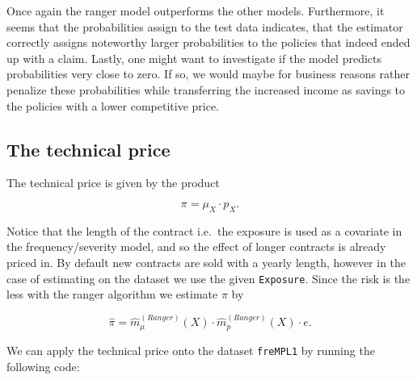 \documentclass[
]{article}
\begin{document}
Once again the ranger model outperforms the other models. Furthermore,
it seems that the probabilities assign to the test data indicates, that
the estimator correctly assigns noteworthy larger probabilities to the
policies that indeed ended up with a claim. Lastly, one might want to
investigate if the model predicts probabilities very close to zero. If
so, we would maybe for business reasons rather penalize these
probabilities while transferring the increased income as savings to the
policies with a lower competitive price.

\newpage

\hypertarget{the-technical-price}{%
\subsection{The technical price}\label{the-technical-price}}

The technical price is given by the product

\[
\pi=\mu_X\cdot p_X.
\]

Notice that the length of the contract i.e.~the exposure is used as a
covariate in the frequency/severity model, and so the effect of longer
contracts is already priced in. By default new contracts are sold with a
yearly length, however in the case of estimating on the dataset we use
the given \texttt{Exposure}. Since the risk is the less with the ranger
algorithm we estimate \(\pi\) by

\[
\hat \pi=\hat m_\mu^{(Ranger)}(X)\cdot\hat m_p^{(Ranger)}(X)\cdot e.
\]

We can apply the technical price onto the dataset \texttt{freMPL1} by
running the following code:
\end{document}
